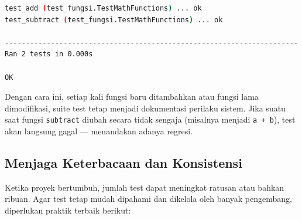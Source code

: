\begin{lstlisting}[language=bash, caption={Keluaran setelah test baru ditambahkan}, label={lst:b10-keluaran-setelah-test-baru-ditambahkan}]
test_add (test_fungsi.TestMathFunctions) ... ok
test_subtract (test_fungsi.TestMathFunctions) ... ok

----------------------------------------------------------------------
Ran 2 tests in 0.000s

OK
\end{lstlisting}

Dengan cara ini, setiap kali fungsi baru ditambahkan atau fungsi lama dimodifikasi, suite test tetap menjadi dokumentasi perilaku sistem.  
Jika suatu saat fungsi \texttt{subtract} diubah secara tidak sengaja (misalnya menjadi \texttt{a + b}), test akan langsung gagal — menandakan adanya regresi.

\subsection{Menjaga Keterbacaan dan Konsistensi}

Ketika proyek bertumbuh, jumlah test dapat meningkat ratusan atau bahkan ribuan.  
Agar test tetap mudah dipahami dan dikelola oleh banyak pengembang, diperlukan praktik terbaik berikut:

